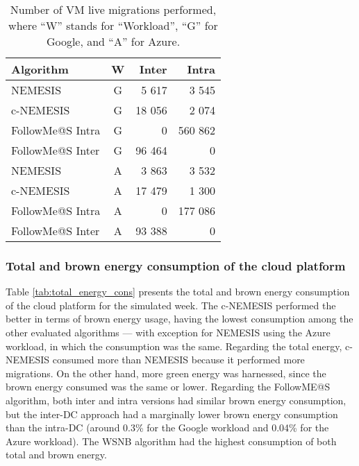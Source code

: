 \begin{table}[!ht]
\caption{Number of VM live migrations performed, where ``W'' stands for ``Workload'', ``G'' for Google, and ``A'' for Azure. }\label{tab:amount_migs} \centering
\begin{tabular}{|l|c|r|r|}
  \hline
  \textbf{Algorithm} & \textbf{W}  & \textbf{Inter} & \textbf{Intra}   \\
  \hline
  NEMESIS  & G & 5 617  & 3 545 \\
  \hline
  c-NEMESIS & G & 18 056  & 2 074 \\
  \hline
  FollowMe@S Intra  & G & 0  & 560 862 \\
  \hline
  FollowMe@S Inter  & G & 96 464 & 0 \\
  \hline
  NEMESIS & A & 3 863 & 3 532 \\
  \hline
  c-NEMESIS & A & 17 479  & 1 300 \\
  \hline
  FollowMe@S Intra  & A & 0  & 177 086 \\
  \hline
  FollowMe@S Inter   & A & 93 388 & 0 \\
  \hline
\end{tabular}
\end{table}

\subsubsection{Total and brown energy consumption of the cloud platform}

Table \ref{tab:total_energy_cons} presents the total and brown energy consumption of the cloud platform for the simulated week. 
The c-NEMESIS performed the better in terms of brown energy usage, having the lowest consumption among the other evaluated algorithms --- 
with exception for NEMESIS using the Azure workload, in which the
consumption was the same. Regarding the total energy, c-NEMESIS
consumed more than NEMESIS because it performed more
migrations. On the other hand, more green energy was harnessed, since the brown
energy consumed was the same or lower. Regarding the FollowME@S
algorithm, both inter and intra versions had similar
brown energy consumption, but the inter-DC approach
had a marginally lower brown energy consumption than the intra-DC (around 0.3\% for the Google workload and 0.04\% for the Azure workload). The WSNB algorithm had the highest consumption of both total and brown energy.

